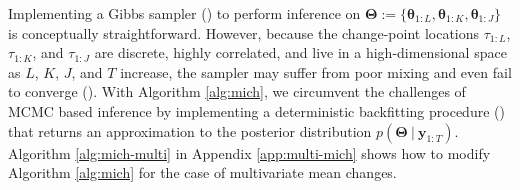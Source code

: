 Implementing a Gibbs sampler (\citealp{Geman84,Gelfand90}) to perform inference on $\boldsymbol{\Theta}:= \{\boldsymbol{\theta}_{1:L},\boldsymbol{\theta}_{1:K},\boldsymbol{\theta}_{1:J}\}$ is conceptually straightforward. %
However, because the change-point locations $\tau_{1:L}$, $\tau_{1:K}$, and $\tau_{1:J}$ are discrete, highly correlated, and live in a high-dimensional space as $L$, $K$, $J$, and $T$ increase, the sampler may suffer from poor mixing and even fail to converge (\citealp{Smith93, Cappello21}). With Algorithm \ref{alg:mich}, we circumvent the challenges of MCMC based inference by implementing a deterministic backfitting procedure (\citealp{Friedman81, Breiman85}) that returns an approximation to the posterior distribution $p(\boldsymbol{\Theta}\:|\:\mathbf{y}_{1:T})$. Algorithm \ref{alg:mich-multi} in Appendix \ref{app:multi-mich} shows how to modify Algorithm \ref{alg:mich} for the case of multivariate mean changes.



